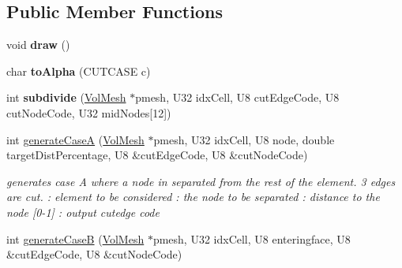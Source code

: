 \subsection*{Public Member Functions}
\begin{DoxyCompactItemize}
\item 
\hypertarget{classps_1_1elastic_1_1TetSubdivider_ab498e762dd8a4789ace462a881a7ae7b}{}void {\bfseries draw} ()\label{classps_1_1elastic_1_1TetSubdivider_ab498e762dd8a4789ace462a881a7ae7b}

\item 
\hypertarget{classps_1_1elastic_1_1TetSubdivider_affebbf7aa37abee39f105b2d80f71173}{}char {\bfseries to\+Alpha} (C\+U\+T\+C\+A\+S\+E c)\label{classps_1_1elastic_1_1TetSubdivider_affebbf7aa37abee39f105b2d80f71173}

\item 
\hypertarget{classps_1_1elastic_1_1TetSubdivider_a5814ddced3c53946587b7226fdd45d99}{}int {\bfseries subdivide} (\hyperlink{classps_1_1elastic_1_1VolMesh}{Vol\+Mesh} $\ast$pmesh, U32 idx\+Cell, U8 cut\+Edge\+Code, U8 cut\+Node\+Code, U32 mid\+Nodes\mbox{[}12\mbox{]})\label{classps_1_1elastic_1_1TetSubdivider_a5814ddced3c53946587b7226fdd45d99}

\item 
\hypertarget{classps_1_1elastic_1_1TetSubdivider_a195dbc4807e828bee0609d9fc54cacad}{}int \hyperlink{classps_1_1elastic_1_1TetSubdivider_a195dbc4807e828bee0609d9fc54cacad}{generate\+Case\+A} (\hyperlink{classps_1_1elastic_1_1VolMesh}{Vol\+Mesh} $\ast$pmesh, U32 idx\+Cell, U8 node, double target\+Dist\+Percentage, U8 \&cut\+Edge\+Code, U8 \&cut\+Node\+Code)\label{classps_1_1elastic_1_1TetSubdivider_a195dbc4807e828bee0609d9fc54cacad}

\begin{DoxyCompactList}\small\item\em generates case A where a node in separated from the rest of the element. 3 edges are cut. \+: element to be considered \+: the node to be separated \+: distance to the node \mbox{[}0-\/1\mbox{]} \+: output cutedge code \end{DoxyCompactList}\item 
\hypertarget{classps_1_1elastic_1_1TetSubdivider_abd5e58f8e350350189dac343d27d4793}{}int \hyperlink{classps_1_1elastic_1_1TetSubdivider_abd5e58f8e350350189dac343d27d4793}{generate\+Case\+B} (\hyperlink{classps_1_1elastic_1_1VolMesh}{Vol\+Mesh} $\ast$pmesh, U32 idx\+Cell, U8 enteringface, U8 \&cut\+Edge\+Code, U8 \&cut\+Node\+Code)\label{classps_1_1elastic_1_1TetSubdivider_abd5e58f8e350350189dac343d27d4793}


\end{DoxyCompactItemize}
